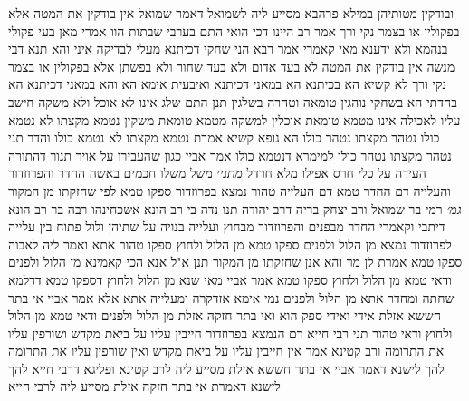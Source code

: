 \documentclass[12pt, openany]{book}
\begin{document}
{ובודקין מטותיהן במילא פרהבא  מסייע ליה לשמואל דאמר שמואל  אין בודקין את המטה אלא בפקולין או בצמר נקי ורך  אמר רב  היינו דכי הואי התם בערבי שבתות הוו אמרי מאן בעי פקולי בנהמא ולא ידענא מאי קאמרי 
אמר רבא  הני שחקי דכיתנא מעלי לבדיקה  איני והא תנא דבי מנשה  אין בודקין את המטה לא בעד אדום ולא בעד שחור ולא בפשתן אלא בפקולין או בצמר נקי ורך 
לא קשיא הא בכיתנא הא במאני דכיתנא  ואיבעית אימא  הא והא במאני דכיתנא הא בחדתי הא בשחקי 
נוהגין טומאה וטהרה בשלגין  תנן התם  שלג אינו לא אוכל ולא משקה  חישב עליו לאכילה אינו מטמא טומאת אוכלין למשקה מטמא טומאת משקין 
נטמא מקצתו לא נטמא כולו נטהר מקצתו נטהר כולו 
הא גופא קשיא אמרת נטמא מקצתו לא נטמא כולו והדר תני נטהר מקצתו נטהר כולו למימרא דנטמא כולו 
אמר אביי  כגון שהעבירו על אויר תנור דהתורה העידה על כלי חרס
אפילו מלא חרדל 
{\large\emph{מתני׳}} משל משלו חכמים באשה החדר והפרוזדור והעלייה 
דם החדר טמא דם העלייה טהור נמצא בפרוזדור ספקו טמא לפי שחזקתו מן המקור
{\large\emph{גמ׳}} רמי בר שמואל ורב יצחק בריה דרב יהודה תנו נדה בי רב הונא אשכחינהו רבה בר רב הונא דיתבי וקאמרי  החדר מבפנים והפרוזדור מבחוץ ועלייה בנויה על שתיהן ולול פתוח בין עלייה לפרוזדור
 נמצא מן הלול ולפנים ספקו טמא מן הלול ולחוץ ספקו טהור 
אתא ואמר ליה לאבוה  ספקו טמא אמרת לן מר  והא אנן שחזקתו מן המקור תנן 
א"ל אנא הכי קאמינא  מן הלול ולפנים ודאי טמא מן הלול ולחוץ ספקו טמא 
אמר אביי  מאי שנא מן הלול ולחוץ דספקו טמא דדלמא שחתה ומחדר אתא  מן הלול ולפנים נמי אימא אזדקרה ומעלייה אתא 
אלא אמר אביי  אי בתר חששא אזלת אידי ואידי ספק הוא ואי בתר חזקה אזלת מן הלול ולפנים ודאי טמא מן הלול ולחוץ ודאי טהור 
תני רבי חייא  דם הנמצא בפרוזדור חייבין עליו על ביאת מקדש ושורפין עליו את התרומה  ורב קטינא אמר  אין חייבין עליו על ביאת מקדש ואין שורפין עליו את התרומה 
להך לישנא דאמר אביי אי בתר חששא אזלת מסייע ליה לרב קטינא ופליגא דרבי חייא
להך לישנא דאמרת אי בתר חזקה אזלת מסייע ליה לרבי חייא}
\end{document}
